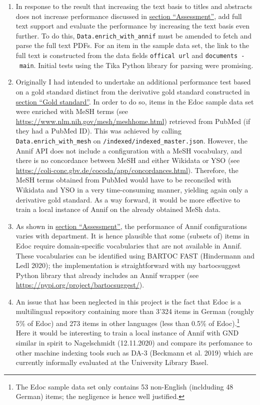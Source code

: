 \begin{enumerate}
\def\labelenumi{\arabic{enumi}.}
\item
  In response to the result that increasing the text basis to titles and
  abstracts does not increase performance discussed in
  \protect\hyperlink{assessment}{section ``Assessment''}, add full text
  support and evaluate the performance by increasing the text basis even
  further. To do this, \texttt{Data.enrich\_with\_annif} must be amended
  to fetch and parse the full text PDFs. For an item in the sample data
  set, the link to the full text is constructed from the data fields
  \texttt{offical\ url} and \texttt{documents\ -\ main}. Initial tests
  using the Tika Python library for parsing were promising.
\item
  Originally I had intended to undertake an additional performance test
  based on a gold standard distinct from the derivative gold standard
  constructed in \protect\hyperlink{gold-standard}{section ``Gold
  standard''}. In order to do so, items in the Edoc sample data set were
  enriched with MeSH terms (see
  \url{https://www.nlm.nih.gov/mesh/meshhome.html}) retrieved from
  PubMed (if they had a PubMed ID). This was achieved by calling
  \texttt{Data.enrich\_with\_mesh} on
  \texttt{/indexed/indexed\_master.json}. However, the Annif API does
  not include a configuration with a MeSH vocabulary, and there is no
  concordance between MeSH and either Wikidata or YSO (see
  \url{https://coli-conc.gbv.de/cocoda/app/concordances.html}).
  Therefore, the MeSH terms obtained from PubMed would have to be
  reconciled with Wikidata and YSO in a very time-consuming manner,
  yielding again only a derivative gold standard. As a way forward, it
  would be more effective to train a local instance of Annif on the
  already obtained MeSh data.
\item
  As shown in \protect\hyperlink{assessment}{section ``Assessment''},
  the performance of Annif configurations varies with department. It is
  hence plausible that some (subsets of) items in Edoc require
  domain-specific vocabularies that are not available in Annif. These
  vocabularies can be identified using BARTOC FAST (Hindermann and Ledl
  2020); the implementation is straightforward with my bartocsuggest
  Python library that already includes an Annif wrapper (see
  \url{https://pypi.org/project/bartocsuggest/}).
\item
  An issue that has been neglected in this project is the fact that Edoc
  is a multilingual repository containing more than 3'324 items in
  German (roughly 5\% of Edoc) and 273 items in other languages (less
  than 0.5\% of Edoc).\footnote{The Edoc sample data set only contains
    53 non-English (inclduding 48 German) items; the negligence is hence
    well justified.} Here it would be interesting to train a local
  instance of Annif with GND similar in spirit to Nagelschmidt
  (12.11.2020) and compare its perfomance to other machine indexing
  tools such as DA-3 (Beckmann et al. 2019) which are currently
  informally evaluated at the University Library Basel.
\end{enumerate}

